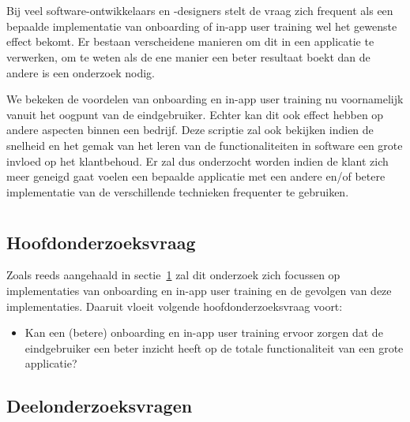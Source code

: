 \section{}
\label{sec:probleemstelling}

Bij veel software-ontwikkelaars en -designers stelt de vraag zich frequent als een bepaalde implementatie van onboarding of in-app user training wel het gewenste effect bekomt. Er bestaan verscheidene manieren om dit in een applicatie te verwerken, om te weten als de ene manier een beter resultaat boekt dan de andere is een onderzoek nodig.

We bekeken de voordelen van onboarding en in-app user training nu voornamelijk vanuit het oogpunt van de eindgebruiker. Echter kan dit ook effect hebben op andere aspecten binnen een bedrijf. Deze scriptie zal ook bekijken indien de snelheid en het gemak van het leren van de functionaliteiten in software een grote invloed op het klantbehoud. Er zal dus onderzocht worden indien de klant zich meer geneigd gaat voelen een bepaalde applicatie met een andere en/of betere implementatie van de verschillende technieken frequenter te gebruiken.

\section{}
\label{sec:onderzoeksvraag}

\subsection{Hoofdonderzoeksvraag}
\label{sec:hoofdonderzoeksvraag}

Zoals reeds aangehaald in sectie~\ref{sec:probleemstelling} zal dit onderzoek zich focussen op implementaties van onboarding en in-app user training en de gevolgen van deze implementaties. Daaruit vloeit volgende hoofdonderzoeksvraag voort:

\begin{itemize}
    \item Kan een (betere) onboarding en in-app user training ervoor zorgen dat de eindgebruiker een beter inzicht heeft op de totale functionaliteit van een grote applicatie?
\end{itemize}

\subsection{Deelonderzoeksvragen}
\label{sec:deelonderzoeksvragen}

